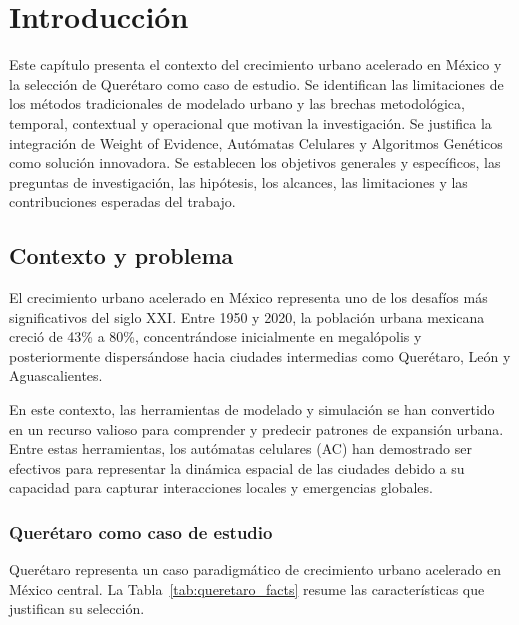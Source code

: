 
\chapter{Introducción}
\label{ch:introduccion}

\begin{resumen}
Este capítulo presenta el contexto del crecimiento urbano acelerado en México y la selección de Querétaro como caso de estudio. Se identifican las limitaciones de los métodos tradicionales de modelado urbano y las brechas metodológica, temporal, contextual y operacional que motivan la investigación. Se justifica la integración de Weight of Evidence, Autómatas Celulares y Algoritmos Genéticos como solución innovadora. Se establecen los objetivos generales y específicos, las preguntas de investigación, las hipótesis, los alcances, las limitaciones y las contribuciones esperadas del trabajo.
\end{resumen}

\section{Contexto y problema}

El crecimiento urbano acelerado en México representa uno de los desafíos más significativos del siglo XXI. Entre 1950 y 2020, la población urbana mexicana creció de 43\% a 80\%, concentrándose inicialmente en megalópolis y posteriormente dispersándose hacia ciudades intermedias como Querétaro, León y Aguascalientes.

En este contexto, las herramientas de modelado y simulación se han convertido en un recurso valioso para comprender y predecir patrones de expansión urbana. Entre estas herramientas, los autómatas celulares (AC) han demostrado ser efectivos para representar la dinámica espacial de las ciudades debido a su capacidad para capturar interacciones locales y emergencias globales.

\subsection{Querétaro como caso de estudio}

Querétaro representa un caso paradigmático de crecimiento urbano acelerado en México central. La Tabla~\ref{tab:queretaro_facts} resume las características que justifican su selección.

